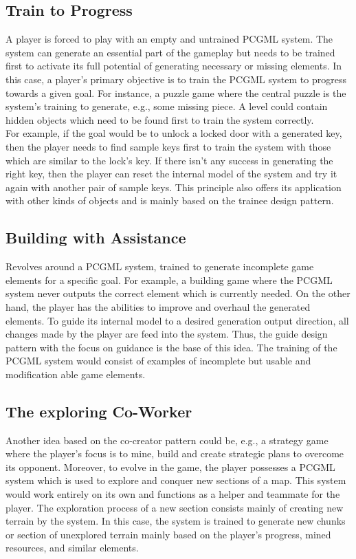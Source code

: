 \documentclass[MGS,Master,english]{twbook}%
\begin{document}
\subsection{Train to Progress} \label{idea::trainToProgress}
A player is forced to play with an empty and untrained PCGML system. The system can generate an essential part of the gameplay but needs to be trained first to activate its full potential of generating necessary or missing elements. In this case, a player’s primary objective is to train the PCGML system to progress towards a given goal. For instance, a puzzle game where the central puzzle is the system’s training to generate, e.g., some missing piece. A level could contain hidden objects which need to be found first to train the system correctly. \\
For example, if the goal would be to unlock a locked door with a generated key, then the player needs to find sample keys first to train the system with those which are similar to the lock's key. If there isn’t any success in generating the right key, then the player can reset the internal model of the system and try it again with another pair of sample keys. This principle also offers its application with other kinds of objects and is mainly based on the trainee design pattern.

\subsection{Building with Assistance} \label{idea::buildingWithAssistance}
Revolves around a PCGML system, trained to generate incomplete game elements for a specific goal. For example, a building game where the PCGML system never outputs the correct element which is currently needed. On the other hand, the player has the abilities to improve and overhaul the generated elements. To guide its internal model to a desired generation output direction, all changes made by the player are feed into the system. Thus, the guide design pattern with the focus on guidance is the base of this idea. The training of the PCGML system would consist of examples of incomplete but usable and modification able game elements.

\subsection{The exploring Co-Worker} \label{idea::exploringCoWorker}
Another idea based on the co-creator pattern could be, e.g., a strategy game where the player’s focus is to mine, build and create strategic plans to overcome its opponent. Moreover, to evolve in the game, the player possesses a PCGML system which is used to explore and conquer new sections of a map. This system would work entirely on its own and functions as a helper and teammate for the player. The exploration process of a new section consists mainly of creating new terrain by the system. In this case, the system is trained to generate new chunks or section of unexplored terrain mainly based on the player’s progress, mined resources, and similar elements.
\end{document}
